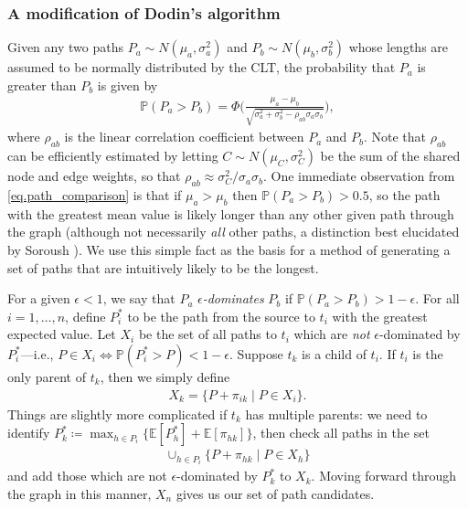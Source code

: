 \documentclass[12pt]{article}
\def\P{\mathbb{P}}
\def\E{\mathbb{E}}
\begin{document}
\subsubsection{A modification of Dodin's algorithm}
\label{subsubsect.path_dodin}

Given any two paths $P_a \sim N(\mu_a, \sigma_a^2)$ and $P_b \sim N(\mu_b, \sigma_b^2)$ whose lengths are assumed to be normally distributed by the CLT, the probability that $P_a$ is greater than $P_b$ is given by
\begin{align}
  \label{eq.path_comparison}
  \P(P_a > P_b) = \Phi \bigg( \frac{\mu_a - \mu_b}{\sqrt{\sigma_a^2 + \sigma_b^2 - \rho_{ab}\sigma_a \sigma_b}} \bigg),
\end{align}
where $\rho_{ab}$ is the linear correlation coefficient between $P_a$ and $P_b$. Note that $\rho_{ab}$ can be efficiently estimated by letting $C \sim N(\mu_C, \sigma_C^2)$ be the sum of the shared node and edge weights, so that $\rho_{ab} \approx \sigma_C^2 / \sigma_a \sigma_b$. 
One immediate observation from \eqref{eq.path_comparison} is that if $\mu_a > \mu_b$ then $\P(P_a > P_b) > 0.5$, so the path with the greatest mean value is likely longer than any other given path through the graph (although not necessarily {\em all} other paths, a distinction best elucidated by Soroush \cite{sor94}). We use this simple fact as the basis for a method of generating a set of paths that are intuitively likely to be the longest.

For a given $\epsilon < 1$, we say that $P_a$ {\em $\epsilon$-dominates} $P_b$ if $\P(P_a > P_b) > 1 - \epsilon$. For all $i = 1, \dots, n$, define $P_i^*$ to be the path from the source to $t_i$ with the greatest expected value. Let $X_i$ be the set of all paths to $t_i$ which are {\em not} $\epsilon$-dominated by $P_i^*$---i.e., $P \in X_i \iff \P(P_i^* > P) < 1- \epsilon$. Suppose $t_k$ is a child of $t_i$. If $t_i$ is the only parent of $t_k$, then we simply define
\begin{align*}
  X_k = \{P + \pi_{ik} \mid P \in X_i\}.
\end{align*}
Things are slightly more complicated if $t_k$ has multiple parents: we need to identify $P_k^* \coloneqq \max_{h \in P_i} \{ \E[P_h^*] + \E[\pi_{hk}] \}$, then check all paths in the set  
\begin{align*}
  \cup_{h \in P_i}\{P + \pi_{hk} \mid P \in X_h \}
\end{align*}
and add those which are not $\epsilon$-dominated by $P_k^*$ to $X_k$. Moving forward through the graph in this manner, $X_n$ gives us our set of path candidates.
\end{document}
